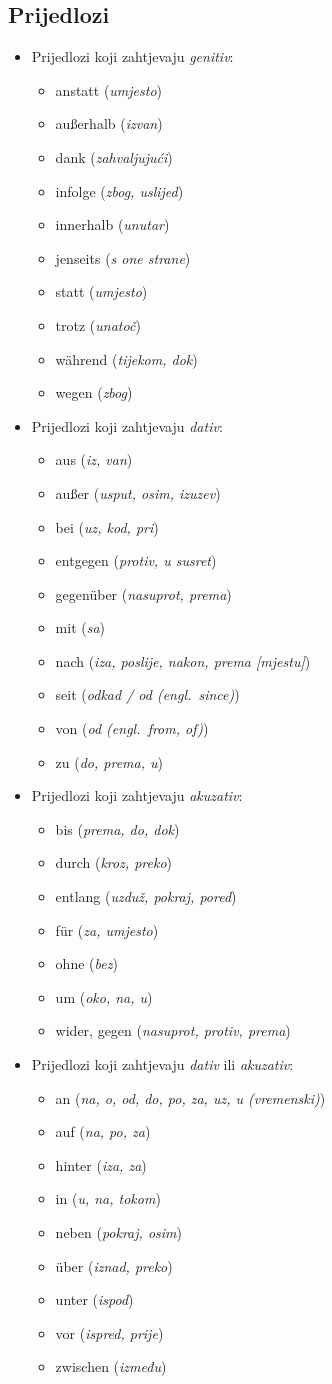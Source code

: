 \documentclass[12pt,german]{article}
\newcommand{\prijevod}[2]{\item #1 (\emph{#2})}
\begin{document}
\begin{multicols}{2}
\section{Prijedlozi}
\begin{itemize}
  \item Prijedlozi koji zahtjevaju \emph{genitiv}:
  \begin{itemize}[nolistsep, label={}]
      \prijevod{anstatt}{umjesto}
      \prijevod{au{\ss}erhalb}{izvan}
      \prijevod{dank}{zahvaljujući}
      \prijevod{infolge}{zbog, uslijed}
      \prijevod{innerhalb}{unutar}
      \prijevod{jenseits}{s one strane}
      \prijevod{statt}{umjesto}
      \prijevod{trotz}{unatoč}
      \prijevod{w\"ahrend}{tijekom, dok}
      \prijevod{wegen}{zbog}
  \end{itemize}

  \item Prijedlozi koji zahtjevaju \emph{dativ}:
  \begin{itemize}[nolistsep, label={}]
      \prijevod{aus}{iz, van}
      \prijevod{au{\ss}er}{usput, osim, izuzev}
      \prijevod{bei}{uz, kod, pri}
      \prijevod{entgegen}{protiv, u susret}
      \prijevod{gegen\"uber}{nasuprot, prema}
      \prijevod{mit}{sa}
      \prijevod{nach}{iza, poslije, nakon, prema [mjestu]}
      \prijevod{seit}{odkad / od (engl.\ \emph{since})}
      \prijevod{von}{od (engl.\ \emph{from, of})}
      \prijevod{zu}{do, prema, u}
  \end{itemize}

  \item Prijedlozi koji zahtjevaju \emph{akuzativ}:
  \begin{itemize}[nolistsep, label={}]
      \prijevod{bis}{prema, do, dok}
      \prijevod{durch}{kroz, preko}
      \prijevod{entlang}{uzduž, pokraj, pored}
      \prijevod{f\"ur}{za, umjesto}
      \prijevod{ohne}{bez}
      \prijevod{um}{oko, na, u}
      \prijevod{wider, gegen}{nasuprot, protiv, prema}
  \end{itemize}

  \item Prijedlozi koji zahtjevaju \emph{dativ} ili \emph{akuzativ}:
  \begin{itemize}[nolistsep, label={}]
      \prijevod{an}{na, o, od, do, po, za, uz, u (vremenski)}
      \prijevod{auf}{na, po, za}
      \prijevod{hinter}{iza, za}
      \prijevod{in}{u, na, tokom}
      \prijevod{neben}{pokraj, osim}
      \prijevod{\"uber}{iznad, preko}
      \prijevod{unter}{ispod}
      \prijevod{vor}{ispred, prije}
      \prijevod{zwischen}{između}
  \end{itemize}
\end{itemize}


\end{multicols}
\end{document}
